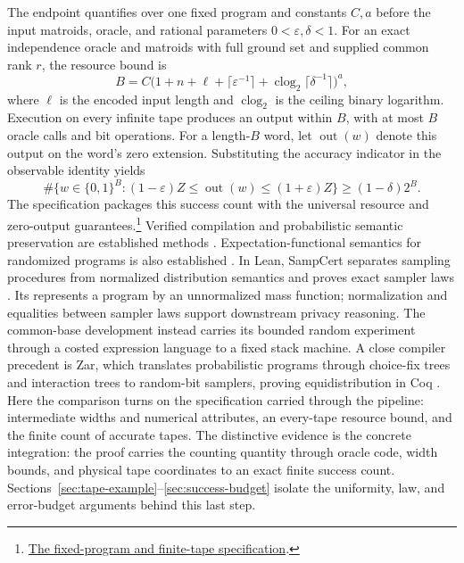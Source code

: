 The endpoint quantifies over one fixed program and constants $C,a$ before
the input matroids, oracle, and rational parameters
$0<\varepsilon,\delta<1$. For an exact independence oracle and matroids
with full ground set and supplied common rank $r$, the resource bound is
\[
 B=C\bigl(1+n+\ell+\lceil\varepsilon^{-1}\rceil
       +\operatorname{clog}_2\lceil\delta^{-1}\rceil\bigr)^a,
\]
where $\ell$ is the encoded input length and $\operatorname{clog}_2$ is
the ceiling binary logarithm. Execution on every infinite tape produces
an output within $B$, with at most $B$ oracle calls and bit operations.
For a length-$B$ word, let $\operatorname{out}(w)$ denote this output on
the word's zero extension. Substituting the accuracy indicator in the
observable identity yields
\[
 \#\{w\in\{0,1\}^B:(1-\varepsilon)Z\leq\operatorname{out}(w)
                  \leq(1+\varepsilon)Z\}
 \geq(1-\delta)2^B.
\]
The specification packages this success count with the universal resource and zero-output guarantees.\footnote{\href{https://github.com/openai/math/blob/fd4aeeb2ee4fc729c18d98444fed42fd0529eeeb/lean/OAI/Combinatorics/MatroidCounting/CommonBases.lean\#L110-L132}{The fixed-program and finite-tape specification}.} Verified compilation and probabilistic semantic preservation are established methods \citep{Leroy2009,CakeML2014,CertiCrypt2009,EasyCrypt2011}. Expectation-functional semantics for randomized programs is also established
\citep{AudebaudPaulinMohring2009}. In Lean, SampCert separates sampling
procedures from normalized distribution semantics and proves exact sampler
laws \citep{deMedeirosEtAl2025}. Its  represents a program by an
unnormalized mass function; normalization and equalities between sampler
laws support downstream privacy reasoning. The common-base development
instead carries its bounded random experiment through a costed expression
language to a fixed stack machine. A close compiler precedent is Zar,
which translates probabilistic programs through choice-fix trees and
interaction trees to random-bit samplers, proving equidistribution in
Coq \citep{BagnallStewartBanerjee2023}. Here the comparison turns on the
specification carried through the pipeline: intermediate widths and
numerical attributes, an every-tape resource bound, and the finite count
of accurate tapes. The distinctive evidence is the
concrete integration: the proof carries the counting quantity through oracle code, width bounds, and physical tape coordinates to an exact finite success count. Sections~\ref{sec:tape-example}--\ref{sec:success-budget} isolate the uniformity, law, and error-budget arguments behind this last step.

